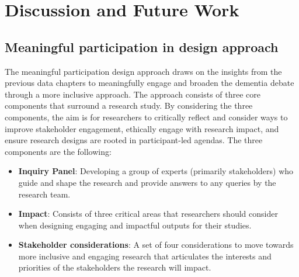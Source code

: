 \chapter{Discussion and Future Work}
\label{Discussion}

\section{Meaningful participation in design approach}
\label{Discussion:Design}
The meaningful participation design approach draws on the insights from the previous data chapters to meaningfully engage and broaden the dementia debate through a more inclusive approach. The approach consists of three core components that surround a research study. By considering the three components, the aim is for researchers to critically reflect and consider ways to improve stakeholder engagement, ethically engage with research impact, and ensure research designs are rooted in participant-led agendas. The three components are the following:

\begin{itemize}
    \item \textbf{Inquiry Panel}: Developing a group of experts (primarily stakeholders) who guide and shape the research and provide answers to any queries by the research team.
    \item \textbf{Impact}: Consists of three critical areas that researchers should consider when designing engaging and impactful outputs for their studies.
    \item \textbf{Stakeholder considerations}: A set of four considerations to move towards more inclusive and engaging research that articulates the interests and priorities of the stakeholders the research will impact.
\end{itemize}

